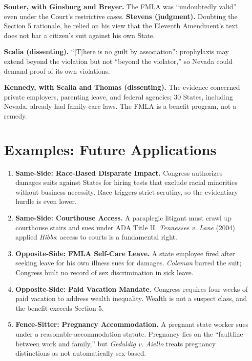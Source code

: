\documentclass[12pt]{article}
\begin{document}
\textbf{Souter, with Ginsburg and Breyer.} The FMLA was ``undoubtedly valid'' even under the Court's restrictive cases. \textbf{Stevens (judgment).} Doubting the Section 5 rationale, he relied on his view that the Eleventh Amendment's text does not bar a citizen's suit against his own State.

\textbf{Scalia (dissenting).} ``[T]here is no guilt by association'': prophylaxis may extend beyond the violation but not ``beyond the violator,'' so Nevada could demand proof of its own violations.

\textbf{Kennedy, with Scalia and Thomas (dissenting).} The evidence concerned private employers, parenting leave, and federal agencies; 30 States, including Nevada, already had family-care laws. The FMLA is a benefit program, not a remedy.

\section{Examples: Future Applications}

\begin{enumerate}
\item \textbf{Same-Side: Race-Based Disparate Impact.} Congress authorizes damages suits against States for hiring tests that exclude racial minorities without business necessity. Race triggers strict scrutiny, so the evidentiary hurdle is even lower.
\item \textbf{Same-Side: Courthouse Access.} A paraplegic litigant must crawl up courthouse stairs and sues under ADA Title II. \textit{Tennessee v. Lane} (2004) applied \textit{Hibbs}: access to courts is a fundamental right.
\item \textbf{Opposite-Side: FMLA Self-Care Leave.} A state employee fired after seeking leave for his own illness sues for damages. \textit{Coleman} barred the suit; Congress built no record of sex discrimination in sick leave.
\item \textbf{Opposite-Side: Paid Vacation Mandate.} Congress requires four weeks of paid vacation to address wealth inequality. Wealth is not a suspect class, and the benefit exceeds Section 5.
\item \textbf{Fence-Sitter: Pregnancy Accommodation.} A pregnant state worker sues under a reasonable-accommodation statute. Pregnancy lies on the ``faultline between work and family,'' but \textit{Geduldig v. Aiello} treats pregnancy distinctions as not automatically sex-based.
\end{enumerate}
\end{document}
